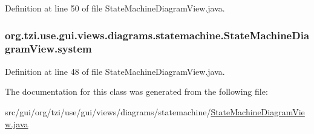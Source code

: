 Definition at line 50 of file State\-Machine\-Diagram\-View.\-java.

\hypertarget{classorg_1_1tzi_1_1use_1_1gui_1_1views_1_1diagrams_1_1statemachine_1_1_state_machine_diagram_view_af2f54ac086a677b0a87ff42852537ef2}{
\subsubsection[{system}]{ org.\-tzi.\-use.\-gui.\-views.\-diagrams.\-statemachine.\-State\-Machine\-Diagram\-View.\-system\hspace{0.3cm}{\ttfamily [protected]}}}\label{classorg_1_1tzi_1_1use_1_1gui_1_1views_1_1diagrams_1_1statemachine_1_1_state_machine_diagram_view_af2f54ac086a677b0a87ff42852537ef2}


Definition at line 48 of file State\-Machine\-Diagram\-View.\-java.



The documentation for this class was generated from the following file\-:\begin{DoxyCompactItemize}
\item 
src/gui/org/tzi/use/gui/views/diagrams/statemachine/\hyperlink{_state_machine_diagram_view_8java}{State\-Machine\-Diagram\-View.\-java}\end{DoxyCompactItemize}
